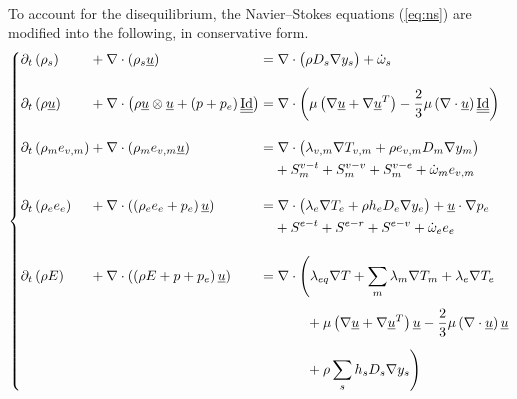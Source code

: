       \paragraph{}
      To account for the disequilibrium, the Navier--Stokes equations (\ref{eq:ns}) are modified into the following, in conservative form.
      \begin{equation}
        \left\{\begin{alignedat}{5}
          &\partial_t\left(  \rho_s  \right) &&+ \nabla\cdot\left(  \rho_s \vec{u}  \right) &&=
            \nabla\cdot\bigl( \rho D_s \nabla y_s\bigr) + \dot \omega_s \\[10pt]
          &\partial_t\left(  \rho \vec{u}  \right) &&+ \nabla\cdot\left(  \rho \vec{u} \otimes \vec{u}  +  \left(p + p_e\right) \mat{\operatorname{Id}}  \right) &&=
            \nabla\cdot\biggl(
              \mu \left(\nabla \vec{u} + \nabla \vec{u}^T\right)
              - \frac{2}{3} \mu \left(\nabla \cdot \vec{u} \right) \mat{\operatorname{Id}}
            \biggr) \\[10pt]
          &\partial_t\left(  \rho_m e_{v,m}  \right) &&+ \nabla\cdot\left(  \rho_m e_{v,m} \vec{u}  \right) &&=
            \nabla\cdot\bigl(
              \lambda_{v,m} \nabla T_{v,m}
              + \rho e_{v,m} D_m \nabla y_m
            \bigr) \\
            &&&&& \phantom{= {}} + S^{v-t}_m + S^{v-v}_m + S^{v-e}_m + \dot \omega_m e_{v,m} \\[10pt]
          &\partial_t\left(  \rho_e e_e  \right) &&+ \nabla\cdot\left(  \left(\rho_e e_e + p_e\right) \vec{u}  \right) &&=
            \nabla\cdot\bigl(
              \lambda_e \nabla T_e
              + \rho h_e D_e \nabla y_e
            \bigr)
            + \vec{u} \cdot \nabla p_e \\
            &&&&& \phantom{= {}} + S^{e-t} + S^{e-r} + S^{e-v} + \dot \omega_e e_e \\[10pt]
          &\partial_t\left(  \rho E  \right) &&+ \nabla\cdot\left(  \left(\rho E + p + p_e\right) \vec{u}  \right) &&=
            \nabla\cdot\Biggl(
              \lambda_{eq} \nabla T
              + \sum_m \lambda_m \nabla T_m
              + \lambda_e \nabla T_e \\
              &&&&& \phantom{=\nabla\cdot\Biggl(} + \mu \left(\nabla \vec{u} + \nabla \vec{u}^T\right) \vec{u} - \frac{2}{3} \mu \left(\nabla \cdot \vec{u}\right) \vec{u} \\
              &&&&& \phantom{=\nabla\cdot\Biggl(} + \rho \sum_s h_s D_s \nabla y_s
            \Biggr)
        \end{alignedat}\right.
      \end{equation}
